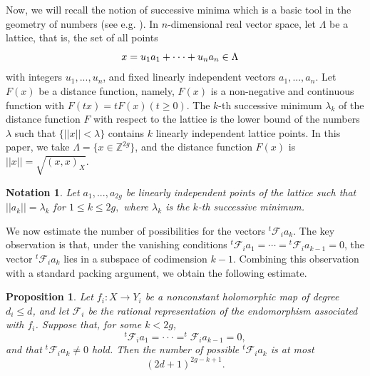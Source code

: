 \documentclass[11pt]{article}
\numberwithin{equation}{section}
\theoremstyle{plain}
\newtheorem{proposition}[theorem]{Proposition}
\newtheorem{notation}[theorem]{Notation}
\begin{document}
 Now, we will recall the notion of successive minima which is a basic tool in the geometry of numbers (see e.g. \cite{Ca}).  In $n$-dimensional real vector space, let $\Lambda$ be a lattice, that is, the set of all points 
\begin{equation*}
x=u_{1}a_{1}+\cdot\cdot\cdot+u_{n}a_{n}\in\Lambda \text{\quad }
\end{equation*}
with integers $u_{1},...,u_{n}$, and fixed linearly independent vectors $a_{1},...,a_{n}$. Let $F(x)$ be a distance function, namely, $F(x)$ is a non-negative and continuous function with $F(tx)=tF(x) (t\ge0)$. The $k$-th successive minimum $\lambda_{k}$ of the distance function $F$ with respect to the lattice is the lower bound of the numbers $\lambda$ such that $\{||x||<\lambda\}$ contains $k$ linearly independent lattice points.  In this paper, we take $\Lambda=\{x\in\mathbb{Z}^{2g}\}$, and the distance function $F(x)$ is $||x||=\sqrt{(x,x)_{X}}.$ 

\begin{notation}
Let $a_{1},...,a_{2g}$ be linearly independent points of the lattice such that $||a_{k}||=\lambda_{k}$ for $1\le k\le2g,$ where $\lambda_{k}$ is the $k$-th successive minimum. 
\end{notation}

We now estimate the number of possibilities for the vectors
${}^{t}\mathcal F_i a_k$.
The key observation is that, under the vanishing conditions
${}^{t}\mathcal F_i a_1=\cdots=
{}^{t}\mathcal F_i a_{k-1}=0$,
the vector
${}^{t}\mathcal F_i a_k$
lies in a subspace of codimension $k-1$.
Combining this observation with a standard packing argument, we obtain the following estimate.
\begin{proposition}\label{prop}
Let $f_{i}:X\rightarrow Y_{i}$ be a nonconstant holomorphic map of degree $d_i\leq d$, 
and let $\mathcal{F}_{i}$ be the rational representation of the endomorphism associated with $f_{i}$.  Suppose that, for some $k<2g$,
\begin{equation*}
{}^{t}\mathcal{F}_{i}a_{1}=\cdot\cdot\cdot=^{t}\mathcal{F}_{i}a_{k-1}=0, 
\end{equation*}
and that  $^{t}\mathcal{F}_{i}a_{k}\ne 0$ hold.  Then the number of possible $^{t}\mathcal{F}_{i}a_{k}$
is at most 
$$
(2d+1)^{2g-k+1}.
$$
\end{proposition}
\end{document}

